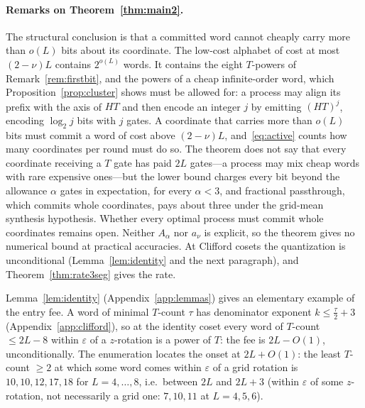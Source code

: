 \documentclass[aps,prx,twocolumn,superscriptaddress,nofootinbib,longbibliography]{revtex4-2}
\theoremstyle{plain}
\theoremstyle{definition}
\theoremstyle{remark}
\begin{document}
\paragraph{Remarks on Theorem~\ref{thm:main2}.}
The structural conclusion is that a committed word cannot cheaply carry more than $o(L)$ bits about its coordinate. The low-cost alphabet of cost at most $(2-\nu)L$ contains $2^{o(L)}$ words. It contains the eight $T$-powers of Remark~\ref{rem:firstbit}, and the powers of a cheap infinite-order word, which Proposition~\ref{prop:cluster} shows must be allowed for: a process may align its prefix with the axis of $HT$ and then encode an integer $j$ by emitting $(HT)^j$, encoding $\log_2j$ bits with $j$ gates. A coordinate that carries more than $o(L)$ bits must commit a word of cost above $(2-\nu)L$, and~\eqref{eq:active} counts how many coordinates per round must do so. The theorem does not say that every coordinate receiving a $T$ gate has paid $2L$ gates---a process may mix cheap words with rare expensive ones---but the lower bound charges every bit beyond the allowance $\alpha$ gates in expectation, for every $\alpha<3$, and fractional passthrough, which commits whole coordinates, pays about three under the grid-mean synthesis hypothesis. Whether every optimal process must commit whole coordinates remains open. Neither $A_\alpha$ nor $a_\nu$ is explicit, so the theorem gives no numerical bound at practical accuracies. At Clifford cosets the quantization is unconditional (Lemma~\ref{lem:identity} and the next paragraph), and Theorem~\ref{thm:rate3seg} gives the rate.

Lemma~\ref{lem:identity} (Appendix~\ref{app:lemmas}) gives an elementary example of the entry fee. A word of minimal $T$-count $\tau$ has denominator exponent $k\le\tfrac\tau2+3$ (Appendix~\ref{app:clifford}), so at the identity coset every word of $T$-count $\le2L-8$ within $\varepsilon$ of a $z$-rotation is a power of $T$: the fee is $2L-O(1)$, unconditionally. The enumeration locates the onset at $2L+O(1)$: the least $T$-count $\ge2$ at which some word comes within $\varepsilon$ of a grid rotation is $10,10,12,17,18$ for $L=4,\dots,8$, i.e.\ between $2L$ and $2L+3$ (within $\varepsilon$ of some $z$-rotation, not necessarily a grid one: $7,10,11$ at $L=4,5,6$).
\end{document}
